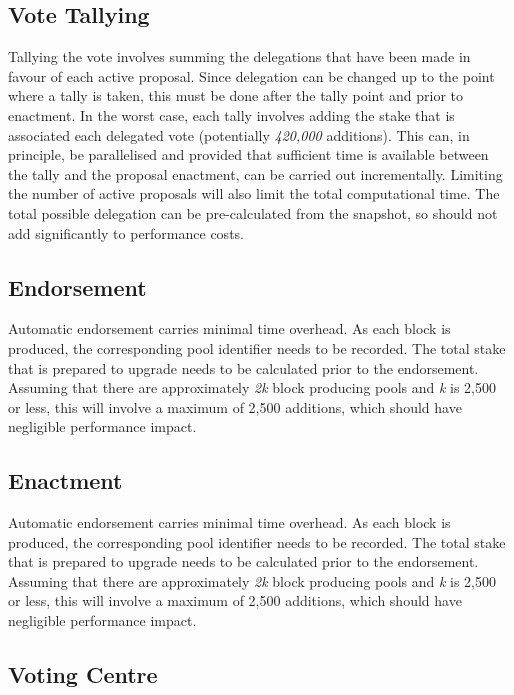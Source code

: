 \subsection{Vote Tallying}

Tallying the vote involves summing the delegations that have been made in favour of each active proposal.  Since delegation can be
changed up to the point where a tally is taken, this must be done after the tally point and prior to enactment.
In the worst case, each tally involves adding the stake that is associated each delegated vote (potentially \emph{420,000}
additions).  This can, in principle, be parallelised and provided that sufficient time is available between the tally
and the proposal enactment, can be carried out incrementally.  Limiting the number of active proposals will also
limit the total computational time.
The total possible delegation can be pre-calculated from the snapshot, so should not add significantly to performance costs.

\subsection{Endorsement}

Automatic endorsement carries minimal time overhead.  As each block is produced, the corresponding  pool identifier needs to be
recorded.  The total stake that is prepared to upgrade needs to be calculated prior to the endorsement.  Assuming that there are
approximately \emph{2k} block producing pools and \emph{k} is 2,500 or less, this will involve a maximum of 2,500 additions,
which should have negligible performance impact.

\subsection{Enactment}

Automatic endorsement carries minimal time overhead.  As each block is produced, the corresponding  pool identifier needs to be
recorded.  The total stake that is prepared to upgrade needs to be calculated prior to the endorsement.  Assuming that there are
approximately \emph{2k} block producing pools and \emph{k} is 2,500 or less, this will involve a maximum of 2,500 additions,
which should have negligible performance impact.

\subsection{Voting Centre}
